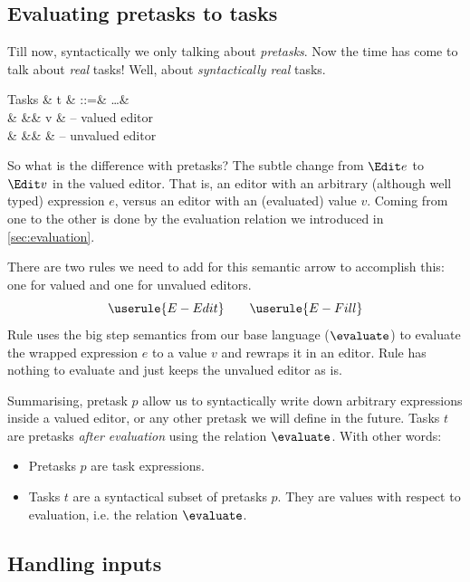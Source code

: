 \subsection{Evaluating pretasks to tasks}
\label{sec:tasks-vs-pretasks}

Till now, syntactically we only talking about \emph{pretasks}.
Now the time has come to talk about \emph{real} tasks!
Well, about \emph{syntactically real} tasks.
\begin{grammar}
  Tasks
    & t & ::=& \ldots       & \\
    &   &\mid& \Edit v      & – valued editor \\
    &   &\mid& \Enter \beta & – unvalued editor \\
\end{grammar}

So what is the difference with pretasks?
The subtle change from $\Edit e$ to $\Edit v$ in the valued editor.
That is, an editor with an arbitrary (although well typed) expression $e$,
versus an editor with an (evaluated) value $v$.
Coming from one to the other is done by the evaluation relation we introduced in \autoref{sec:evaluation}.

There are two rules we need to add for this semantic arrow to accomplish this:
one for valued and one for unvalued editors.
\begin{equation*}
  \userule{E-Edit} \qquad \userule{E-Fill}
\end{equation*}
Rule  uses the big step semantics from our base language ($\evaluate$)
to evaluate the wrapped expression $e$ to a value $v$ and rewraps it in an editor.
Rule  has nothing to evaluate and just keeps the unvalued editor as is.

Summarising, pretask $p$ allow us to syntactically write down arbitrary expressions inside a valued editor,
or any other pretask we will define in the future.
Tasks $t$ are pretasks \emph{after evaluation} using the relation $\evaluate$.
With other words:
\begin{itemize}
  \item
    Pretasks $p$ are task expressions.
  \item
    Tasks $t$ are a syntactical subset of pretasks $p$.
    They are values with respect to evaluation, i.e. the relation $\evaluate$.
\end{itemize}


\subsection{Handling inputs}
\label{sec:handling}

